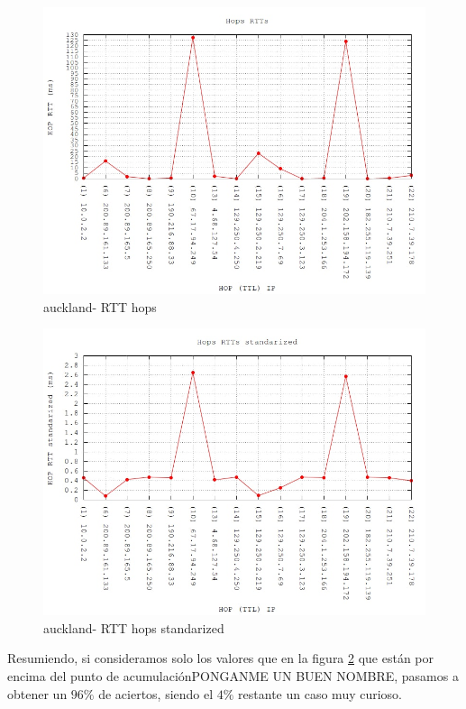 \begin{figure}[!htbp]
  \centering
    \includegraphics[scale=0.5]{imagenes/auckland-graficos/traceroute-auckland.jpg}
  \caption{auckland- RTT hops}
  \label{fig:7}
\end{figure}

\begin{figure}[!htbp]
  \centering
    \includegraphics[scale=0.5]{imagenes/auckland-graficos/traceroute-auckland-standarized.jpg}
  \caption{auckland- RTT hops standarized}
  \label{fig:8}
\end{figure}


Resumiendo, si consideramos solo los valores que en la figura \ref{fig:8} que están por encima del punto de acumulaciónPONGANME UN BUEN NOMBRE, pasamos a obtener un $96\%$ de aciertos, siendo el $4\%$ restante un caso muy curioso.

